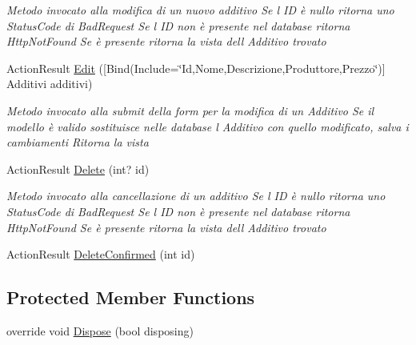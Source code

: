\begin{DoxyCompactItemize}
\begin{DoxyCompactList}\small\item\em Metodo invocato alla modifica di un nuovo additivo Se l\textquotesingle{} ID è nullo ritorna uno Status\+Code di Bad\+Request Se l\textquotesingle{} ID non è presente nel database ritorna Http\+Not\+Found Se è presente ritorna la vista dell\textquotesingle{} Additivo trovato \end{DoxyCompactList}\item 
Action\+Result \mbox{\hyperlink{class_brew_day2_1_1_controllers_1_1_additivi_controller_a476cc279dc89be5682d4a9fe4d512a18}{Edit}} (\mbox{[}Bind(Include=\char`\"{}Id,Nome,Descrizione,Produttore,Prezzo\char`\"{})\mbox{]} Additivi additivi)
\begin{DoxyCompactList}\small\item\em Metodo invocato alla submit della form per la modifica di un Additivo Se il modello è valido sostituisce nelle database l\textquotesingle{} Additivo con quello modificato, salva i cambiamenti Ritorna la vista \end{DoxyCompactList}\item 
Action\+Result \mbox{\hyperlink{class_brew_day2_1_1_controllers_1_1_additivi_controller_a444b3db44aec4ff853dadb3312b81372}{Delete}} (int? id)
\begin{DoxyCompactList}\small\item\em Metodo invocato alla cancellazione di un additivo Se l\textquotesingle{} ID è nullo ritorna uno Status\+Code di Bad\+Request Se l\textquotesingle{} ID non è presente nel database ritorna Http\+Not\+Found Se è presente ritorna la vista dell\textquotesingle{} Additivo trovato \end{DoxyCompactList}\item 
Action\+Result \mbox{\hyperlink{class_brew_day2_1_1_controllers_1_1_additivi_controller_a039d3630deec332cf2deb548deceb6c7}{Delete\+Confirmed}} (int id)
\end{DoxyCompactItemize}
\subsection*{Protected Member Functions}
\begin{DoxyCompactItemize}
\item 
override void \mbox{\hyperlink{class_brew_day2_1_1_controllers_1_1_additivi_controller_aa678739843674fffd0f20c51e84bf78e}{Dispose}} (bool disposing)
\end{DoxyCompactItemize}


